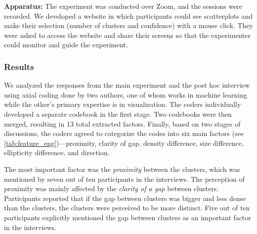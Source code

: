 \noindent
\textbf{Apparatus:}
The experiment was conducted over Zoom, and the sessions were recorded. We developed a website in which participants could see scatterplots and make their selection (number of clusters and confidence) with a mouse click. 
They were asked to access the website and share their screens so that the experimenter could monitor and guide the experiment. 

\subsubsection{Results}
\label{sec:preexpresults}

We analyzed the responses from the main experiment and the post hoc interview using axial coding done by two authors, one of whom works in machine learning while the other's primary expertise is in visualization.
% 
The coders individually developed a separate codebook in the first stage. Two codebooks were then merged, 
resulting in 13 total extracted factors. Finally, based on two stages of discussions, the coders agreed to categorize the codes into six main factors
(see \autoref{tab:feature_eng})---proximity, clarity of gap, density difference, size difference, ellipticity difference, and direction.

The most important factor was the \textit{proximity} between the clusters, 
which was mentioned by seven out of ten participants in the interviews. 
The perception of proximity was mainly affected by the \textit{clarity of a gap} between clusters. Participants reported that if the gap between clusters was bigger and 
less dense than the clusters, the clusters were perceived to be more distinct. Five out of ten participants explicitly mentioned the gap between clusters as an important factor in the interviews. 

